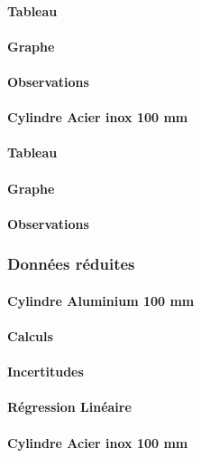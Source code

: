\paragraph{Tableau}
\paragraph{Graphe}
\paragraph{Observations}

\paragraph{\large Cylindre Acier inox 100 mm}
\paragraph{Tableau}
\paragraph{Graphe}
\paragraph{Observations}

\newpage

\subsubsection{\large Données réduites}
\paragraph{\large Cylindre Aluminium 100 mm}
\paragraph{Calculs}
\paragraph{Incertitudes}
\paragraph{Régression Linéaire}

\paragraph{\large Cylindre Acier inox 100 mm}
